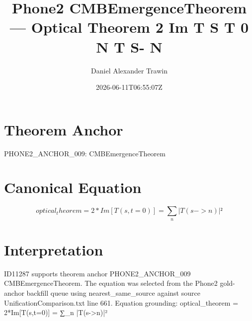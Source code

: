 \documentclass[11pt]{article}
\title{Phone2 CMBEmergenceTheorem — Optical Theorem 2 Im T S T 0 N T S- N}
\author{Daniel Alexander Trawin}
\date{2026-06-11T06:55:07Z}
\begin{document}
\maketitle
\section*{Theorem Anchor}
PHONE2_ANCHOR_009: CMBEmergenceTheorem
\section*{Canonical Equation}
\[
optical_theorem = 2*Im[T(s,t=0)] = ∑_n |T(s->n)|²
\]
\section*{Interpretation}
ID11287 supports theorem anchor PHONE2_ANCHOR_009 CMBEmergenceTheorem. The equation was selected from the Phone2 gold-anchor backfill queue using nearest_same_source against source UnificationComparison.txt line 661. Equation grounding: optical_theorem = 2*Im[T(s,t=0)] = ∑_n |T(s->n)|²
\end{document}
